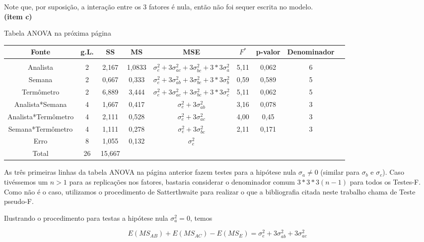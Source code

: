 \documentclass[12pt]{article}
\begin{document}
Note que, por suposição, a interação entre os 3 fatores é nula, então não foi sequer escrita no modelo.  \\



\textbf{(item c)} 

Tabela ANOVA na próxima página

\begin{landscape}


\begin{tabular}{c|cccccccp{10mm}}
    \textbf{Fonte} & g.L. & SS & MS & MSE & $F^*$ & p-valor & Denominador  \\\hline 
    \\
    Analista & 2 & 2,167 & 1,0833 & $\sigma_e^2 + 3\sigma_{ac}^2 + 3\sigma_{bc}^2 + 3*3\sigma_a^2$ & 5,11 & 0,062  & 6 \\
    Semana & 2 & 0,667 & 0,333 & $\sigma_e^2 + 3\sigma_{ab}^2 + 3\sigma_{bc}^2 + 3*3\sigma_b^2$ & 0,59 & 0,589 & 5 \\
    Termômetro & 2 & 6,889 & 3,444 & $\sigma_e^2 + 3\sigma_{ac}^2 + 3\sigma_{bc}^2 + 3*3\sigma_c^2$ & 5,11 & 0,062 & 5 \\
    Analista*Semana & 4 & 1,667 & 0,417 & $\sigma_e^2 + 3\sigma_{ab}^2$ & 3,16 & 0,078 & 3 \\
    Analista*Termômetro & 4 & 2,111 & 0,528 & $\sigma_e^2 + 3\sigma_{ac}^2$ & 4,00 & 0,45 & 3 \\
    Semana*Termômetro & 4 & 1,111 & 0,278 & $\sigma_e^2 + 3\sigma_{bc}^2$ & 2,11 & 0,171 & 3 \\
    Erro & 8 & 1,055 & 0,132 & $\sigma_e^2$ & & & \\\hline
    Total & 26 & 15,667 & & & & & 
\end{tabular}



\end{landscape}

As três primeiras linhas da tabela ANOVA na página anterior fazem testes para a hipótese nula $\sigma_a \neq 0$ (similar para $\sigma_b$ e $\sigma_c$). Caso tivéssemos um $n > 1$ para as replicações nos fatores, bastaria considerar o denominador comum $3*3*3(n-1)$ para todos os Testes-F. Como não é o caso, utilizamos o procedimento de Satterthwaite para realizar o que a bibliografia citada neste trabalho chama de Teste pseudo-F. 

Ilustrando o procedimento para testas a hipótese nula $\sigma_a^2 = 0$, temos 

$$E(MS_{AB}) + E(MS_{AC}) - E(MS_E) = \sigma_e^2 + 3\sigma_{ab}^2 + 3\sigma_{ac}^2$$
\end{document}
